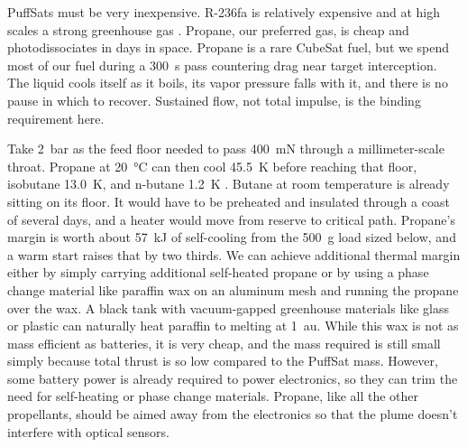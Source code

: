 \documentclass{article}
\begin{document}
PuffSats must be very inexpensive. R-236fa is relatively expensive and at high scales a strong greenhouse gas \cite{ghgprotocol_gwp_values}. Propane, our preferred gas, is cheap and photodissociates in days in space. Propane is a rare CubeSat fuel, but we spend most of our fuel during a \SI{300}{\second} pass countering drag near target interception. The liquid cools itself as it boils, its vapor pressure falls with it, and there is no pause in which to recover. Sustained flow, not total impulse, is the binding requirement here.

Take \SI{2}{\bar} as the feed floor needed to pass \SI{400}{\milli\newton} through a millimeter-scale throat. Propane at \SI{20}{\celsius} can then cool \SI{45.5}{\kelvin} before reaching that floor, isobutane \SI{13.0}{\kelvin}, and n-butane \SI{1.2}{\kelvin} \cite{nist_webbook_propane,nist_webbook_butane,nist_webbook_isobutane}. Butane at room temperature is already sitting on its floor. It would have to be preheated and insulated through a coast of several days, and a heater would move from reserve to critical path. Propane's margin is worth about \SI{57}{\kilo\joule} of self-cooling from the \SI{500}{\gram} load sized below, and a warm start raises that by two thirds. We can achieve additional thermal margin either by simply carrying additional self-heated propane or by using a phase change material like paraffin wax on an aluminum mesh and running the propane over the wax. A black tank with vacuum-gapped greenhouse materials like glass or plastic can naturally heat paraffin to melting at \SI{1}{\astronomicalunit}. While this wax is not as mass efficient as batteries, it is very cheap, and the mass required is still small simply because total thrust is so low compared to the PuffSat mass. However, some battery power is already required to power electronics, so they can trim the need for self-heating or phase change materials. Propane, like all the other propellants, should be aimed away from the electronics so that the plume doesn't interfere with optical sensors.
\end{document}

